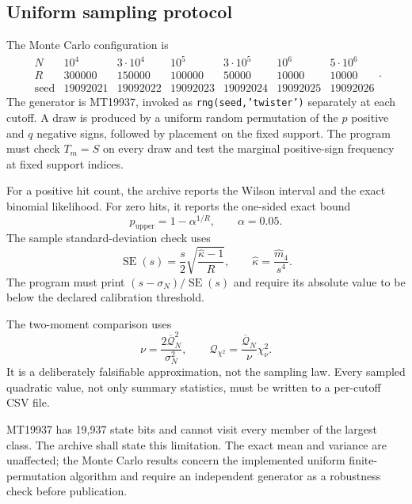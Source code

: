 \documentclass[11pt,reqno]{amsart}
\numberwithin{equation}{section}
\theoremstyle{plain}
\theoremstyle{definition}
\theoremstyle{remark}
\newcommand{\QF}{\mathcal Q}
\begin{document}
\subsection{Uniform sampling protocol}
\label{subsec:uniform-sampling-protocol}

The Monte Carlo configuration is
\begin{equation}
\begin{array}{c|rrrrrr}
N&10^4&3\cdot10^4&10^5&3\cdot10^5&10^6&5\cdot10^6\\ \hline
R&300000&150000&100000&50000&10000&10000\\
\text{seed}&19092021&19092022&19092023&19092024&19092025&19092026
\end{array}.
\label{eq:monte-carlo-configuration}
\end{equation}
The generator is MT19937, invoked as
\texttt{rng(seed,'twister')} separately at each cutoff.  A draw is produced
by a uniform random permutation of the \(p\) positive and \(q\) negative
signs, followed by placement on the fixed support.  The program must check
\(T_m=S\) on every draw and test the marginal positive-sign frequency at
fixed support indices.

For a positive hit count, the archive reports the Wilson interval and the
exact binomial likelihood.  For zero hits, it reports the one-sided exact
bound
\begin{equation}
p_{\mathrm{upper}}=1-\alpha^{1/R},\qquad \alpha=0.05.
\label{eq:clopper-pearson-zero-bound}
\end{equation}
The sample standard-deviation check uses
\begin{equation}
\operatorname{SE}(s)
=\frac{s}{2}\sqrt{\frac{\widehat\kappa-1}{R}},
\qquad
\widehat\kappa=\frac{\widehat m_4}{s^4}.
\label{eq:sample-standard-deviation-se}
\end{equation}
The program must print
\((s-\sigma_N)/\operatorname{SE}(s)\) and require its absolute value to be
below the declared calibration threshold.

The two-moment comparison uses
\begin{equation}
\nu=\frac{2\overline{\QF}_N^2}{\sigma_N^2},\qquad
\QF_{\chi^2}=\frac{\overline{\QF}_N}{\nu}\chi_{\nu}^2.
\label{eq:two-moment-chi-square-model}
\end{equation}
It is a deliberately falsifiable approximation, not the sampling law.
Every sampled quadratic value, not only summary statistics, must be written
to a per-cutoff CSV file.

MT19937 has 19,937 state bits and cannot visit every member of the largest
class.  The archive shall state this limitation.  The exact mean and variance
are unaffected; the Monte Carlo results concern the implemented uniform
finite-permutation algorithm and require an independent generator as a
robustness check before publication.
\end{document}
